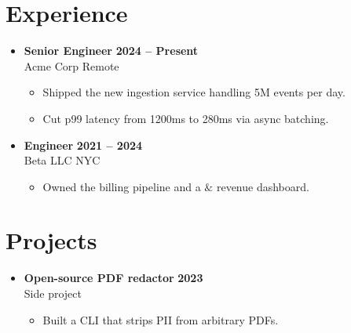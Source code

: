\documentclass[letterpaper,10pt]{article}
\newcommand{\resumeItem}[1]{\item #1}
\newcommand{\resumeSubheading}[4]{\item \textbf{#1} \hfill \textbf{#2}\\ #3 \hfill #4}
\begin{document}
\section{Experience}
\begin{itemize}
  \resumeSubheading{Senior Engineer}{2024 -- Present}{Acme Corp}{Remote}
    \begin{itemize}
      \resumeItem{Shipped the new ingestion service handling 5M events per day.}
      \resumeItem{Cut p99 latency from 1200ms to 280ms via async batching.}
    \end{itemize}
  \resumeSubheading{Engineer}{2021 -- 2024}{Beta LLC}{NYC}
    \begin{itemize}
      \resumeItem{Owned the billing pipeline and a $\&$ revenue dashboard.}
    \end{itemize}
\end{itemize}

\section{Projects}
\begin{itemize}
  \resumeSubheading{Open-source PDF redactor}{2023}{Side project}{}
    \begin{itemize}
      \resumeItem{Built a CLI that strips PII from arbitrary PDFs.}
    \end{itemize}
\end{itemize}
\end{document}
